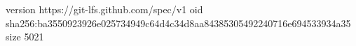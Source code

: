 version https://git-lfs.github.com/spec/v1
oid sha256:ba3550923926e025734949c64d4c34d8aa84385305492240716e694533934a35
size 5021

